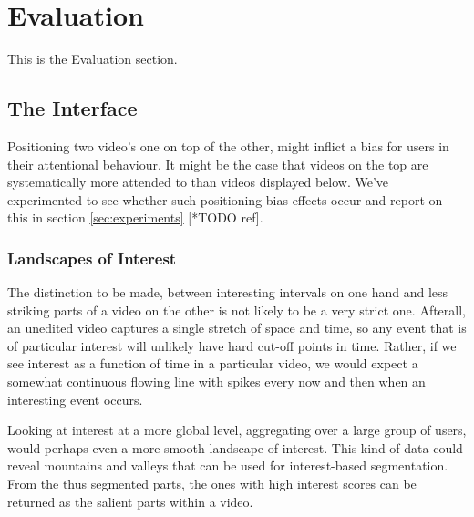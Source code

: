 \chapter{Evaluation}
\label{ch:evaluation}

This is the Evaluation section.


\section{The Interface}
Positioning two video's one on top of the other, might inflict a bias for users in their attentional behaviour. It might be the case that videos on the top are systematically more attended to than videos displayed below. We've experimented to see whether such positioning bias effects occur and report on this in section \ref{sec:experiments} [*TODO ref].


\subsection{Landscapes of Interest}

The distinction to be made, between interesting intervals on one hand and less striking parts of a video on the other is not likely to be a very strict one. Afterall, an unedited video captures a single stretch of space and time, so any event that is of particular interest will unlikely have hard cut-off points in time. Rather, if we see interest as a function of time in a particular video, we would expect a somewhat continuous flowing line with spikes every now and then when an interesting event occurs. 

Looking at interest at a more global level, aggregating over a large group of users, would perhaps even a more smooth landscape of interest. This kind of data could reveal mountains and valleys that can be used for interest-based segmentation. From the thus segmented parts, the ones with high interest scores can be returned as the salient parts within a video.